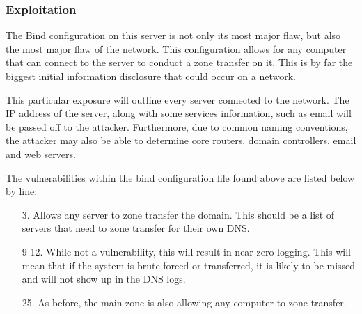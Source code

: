 			\subsubsection{Exploitation}
				The Bind configuration on this server is not only its most major flaw, but also the most major flaw of the network.
				This configuration allows for any computer that can connect to the server to conduct a zone transfer on it. 
				This is by far the biggest initial information disclosure that could occur on a network. 

				This particular exposure will outline every server connected to the network. 
				The IP address of the server, along with some services information, such as email will be passed off to the attacker. 
				Furthermore, due to common naming conventions, the attacker may also be able to determine core routers, domain controllers, email and web servers. 

				The vulnerabilities within the bind configuration file found above are listed below by line:
				\begin{enumerate}
					\item[3.] Allows any server to zone transfer the domain. 
						This should be a list of servers that need to zone transfer for their own DNS. 
					\item[9-12.] While not a vulnerability, this will result in near zero logging.  
						This will mean that if the system is brute forced or transferred, 
						it is likely to be missed and will not show up in the DNS logs. 
					\item[25.] As before, the main zone is also allowing any computer to zone transfer.
				\end{enumerate}

